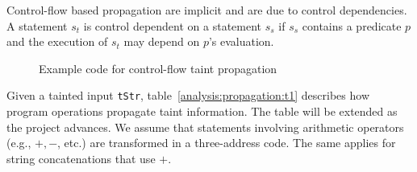 Control-flow based propagation are implicit and are due to
control dependencies. A statement $s_t$ is control dependent on
a statement $s_s$ if $s_s$ contains a predicate $p$ and the execution
of $s_t$ may depend on $p$'s evaluation.

\begin{figure}[!h]
\begin{center}
\end{center}
\caption{Example code for control-flow taint propagation}
\label{fig:cfpropagation}
\end{figure}

Given a tainted input \texttt{tStr}, table~\ref{analysis:propagation:t1}
describes how program operations propagate taint information. The table
will be extended as the project advances.
We assume that statements involving arithmetic operators (e.g., $+, -$, etc.)
are transformed in a three-address code. The same applies for string
concatenations that use $+$.